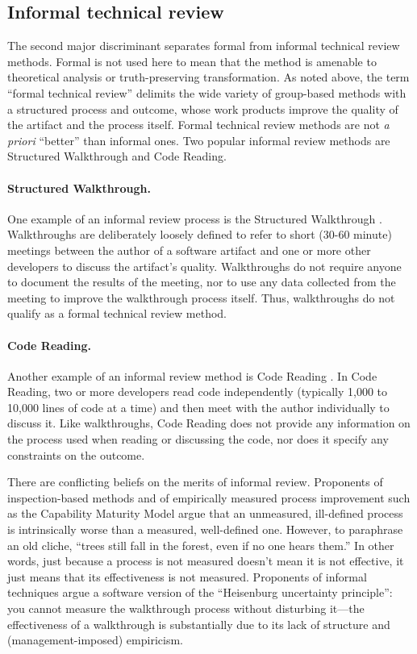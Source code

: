 \subsection*{Informal technical review}

The second major discriminant separates formal from informal technical
review methods.  Formal is not used here to mean that the method is
amenable to theoretical analysis or truth-preserving transformation.  As
noted above, the term ``formal technical review'' delimits the wide variety
of group-based methods with a structured process and outcome, whose work
products improve the quality of the artifact and the process itself.
Formal technical review methods are not {\em a priori\/} ``better'' than
informal ones.  Two popular informal review methods are Structured
Walkthrough and Code Reading.

\paragraph{Structured Walkthrough.}
One example of an informal review process is the Structured Walkthrough
\cite{Yourdon89}.  Walkthroughs are deliberately loosely defined to refer
to short (30-60 minute) meetings between the author of a software artifact
and one or more other developers to discuss the artifact's quality.
Walkthroughs do not require anyone to document the results of the meeting,
nor to use any data collected from the meeting to improve the walkthrough
process itself.  Thus, walkthroughs do not qualify as a formal technical
review method.

\paragraph{Code Reading.}
Another example of an informal review method is Code Reading
\cite{McConnell93,Card87}.  In Code Reading, two or more developers read
code independently (typically 1,000 to 10,000 lines of code at a time) and
then meet with the author individually to discuss it.  Like walkthroughs,
Code Reading does not provide any information on the process used when
reading or discussing the code, nor does it specify any constraints on the
outcome.

\medskip

There are conflicting beliefs on the merits of informal review.  Proponents
of inspection-based methods and of empirically measured process improvement
such as the Capability Maturity Model argue that an unmeasured,
ill-defined process is intrinsically worse than a measured, well-defined
one.  However, to paraphrase an old cliche, ``trees still fall in the
forest, even if no one hears them.''  In other words, just because a
process is not measured doesn't mean it is not effective, it just means
that its effectiveness is not measured.  Proponents of informal techniques
argue a software version of the ``Heisenburg uncertainty principle'': you
cannot measure the walkthrough process without disturbing it---the
effectiveness of a walkthrough is substantially due to its lack of
structure and (management-imposed) empiricism.


